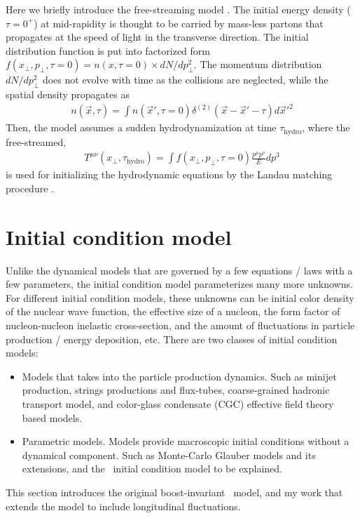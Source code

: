Here we briefly introduce the free-streaming model \cite{Liu:2015nwa}.
The initial energy density ($\tau = 0^+$) at mid-rapidity is thought to be carried by mass-less partons that propagates at the speed of light in the transverse direction. 
The initial distribution function is put into factorized form $f(x_\perp, p_\perp, \tau=0) = n(x, \tau=0) \times dN/dp_\perp^2$.
The momentum distribution $dN/dp_\perp^2$ does not evolve with time as the collisions are neglected, while the spatial density propagates as
\begin{eqnarray}
n(\vec{x}, \tau) = \int n(\vec{x}', \tau=0) \delta^{(2)}(\vec{x} - \vec{x}'- \tau) d\vec{x}'^2
\end{eqnarray}
Then, the model assumes a sudden hydrodynamization at time $\tau_{\textrm{hydro}}$, where the free-streamed,
\begin{eqnarray}
T^{\mu\nu}(x_\perp, \tau_{\textrm{hydro}}) = \int f(x_\perp, p_\perp, \tau=0) \frac{p^\mu p^\nu}{E} dp^3
\end{eqnarray}
is used for initializing the hydrodynamic equations by the Landau matching procedure \cite{Liu:2015nwa}.

\section{Initial condition model}
Unlike the dynamical models that are governed by a few equations / laws with a few parameters, the initial condition model parameterizes many more unknowns.
For different initial condition models, these unknowns can be initial color density of the nuclear wave function, the effective size of a nucleon, the form factor of nucleon-nucleon inelastic cross-section, and the amount of fluctuations in particle production / energy deposition, etc.
There are two classes of initial condition models:
\begin{itemize}
\item Models that takes into the particle production dynamics. Such as minijet production, strings productions and flux-tubes, coarse-grained hadronic transport model, and color-glass condensate (CGC) effective field theory based models.
\item Parametric models. Models provide macroscopic initial conditions without a dynamical component. Such as Monte-Carlo Glauber models and its extensions, and the \trento\ initial condition model to be explained.
\end{itemize}
This section introduces the original boost-invariant \trento\ model, and my work that extends the model to include longitudinal fluctuations.

